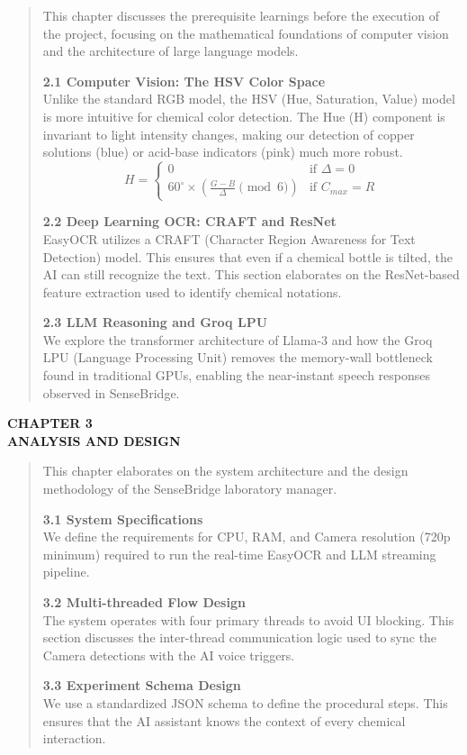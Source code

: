 \documentclass[]{article}
\begin{document}
\begin{quote}
This chapter discusses the prerequisite learnings before the execution of the project, focusing on the mathematical foundations of computer vision and the architecture of large language models.

\textbf{2.1 Computer Vision: The HSV Color Space} \\
Unlike the standard RGB model, the HSV (Hue, Saturation, Value) model is more intuitive for chemical color detection. The Hue (H) component is invariant to light intensity changes, making our detection of copper solutions (blue) or acid-base indicators (pink) much more robust.
\begin{equation}
    H = \begin{cases} 0 & \text{if } \Delta = 0 \\ 60^\circ \times \left( \frac{G-B}{\Delta} \pmod 6 \right) & \text{if } C_{max} = R \end{cases}
\end{equation}

\textbf{2.2 Deep Learning OCR: CRAFT and ResNet} \\
EasyOCR utilizes a CRAFT (Character Region Awareness for Text Detection) model. This ensures that even if a chemical bottle is tilted, the AI can still recognize the text. This section elaborates on the ResNet-based feature extraction used to identify chemical notations.

\textbf{2.3 LLM Reasoning and Groq LPU} \\
We explore the transformer architecture of Llama-3 and how the Groq LPU (Language Processing Unit) removes the memory-wall bottleneck found in traditional GPUs, enabling the near-instant speech responses observed in SenseBridge.
\end{quote}

\newpage

\textbf{CHAPTER 3} \\
\textbf{ANALYSIS AND DESIGN}

\begin{quote}
This chapter elaborates on the system architecture and the design methodology of the SenseBridge laboratory manager.

\textbf{3.1 System Specifications} \\
We define the requirements for CPU, RAM, and Camera resolution (720p minimum) required to run the real-time EasyOCR and LLM streaming pipeline.

\textbf{3.2 Multi-threaded Flow Design} \\
The system operates with four primary threads to avoid UI blocking. This section discusses the inter-thread communication logic used to sync the Camera detections with the AI voice triggers.

\textbf{3.3 Experiment Schema Design} \\
We use a standardized JSON schema to define the procedural steps. This ensures that the AI assistant knows the context of every chemical interaction.
\end{quote}
\end{document}
